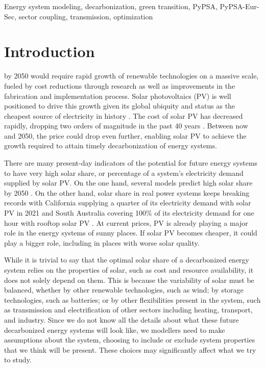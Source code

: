 \documentclass[lettersize,journal]{IEEEtran}
\begin{document}
\begin{IEEEkeywords}
Energy system modeling, decarbonization, green transition, PyPSA, PyPSA-Eur-Sec, sector coupling, transmission, optimization
\end{IEEEkeywords}

\section{Introduction}
 by 2050 would require rapid growth of renewable technologies on a massive scale, fueled by cost reductions through research as well as improvements in the fabrication and implementation process. Solar photovoltaics (PV) is well positioned to drive this growth given its global ubiquity and status as the cheapest source of electricity in history \cite{noauthor_solar_nodate}. The cost of solar PV has decreased rapidly, dropping two orders of magnitude in the past 40 years \cite{haegel_terawatt-scale_2019}. Between now and 2050, the price could drop even further, enabling solar PV to achieve the growth required to attain timely decarbonization of energy systems.

There are many present-day indicators of the potential for future energy systems to have very high solar share, or percentage of a system's electricity demand supplied by solar PV. On the one hand, several models predict high solar share by 2050 \cite{frew_sunny_2019, breyer_role_2017, victoria_early_2020, Breyer_history, luderer_impact_2022, D1EE02497C}. On the other hand, solar share in real power systems keeps breaking records with California supplying a quarter of its electricity demand with solar PV in 2021\cite{feldman_fall_nodate} and South Australia covering 100\% of its electricity demand for one hour with rooftop solar PV \cite{parkinson_rooftop_2021}. At current prices, PV is already playing a major role in the energy systems of sunny places. If solar PV becomes cheaper, it could play a bigger role, including in places with worse solar quality. 


While it is trivial to say that the optimal solar share of a decarbonized energy system relies on the properties of solar, such as cost and resource availability, it does not solely depend on them. This is because the variability of solar must be balanced, whether by other renewable technologies, such as wind; by storage technologies, such as batteries; or by other flexibilities present in the system, such as transmission and electrification of other sectors including heating, transport, and industry. Since we do not know all the details about what these future decarbonized energy systems will look like, we modellers need to make assumptions about the system, choosing to include or exclude system properties that we think will be present. These choices may significantly affect what we try to study.
\end{document}
